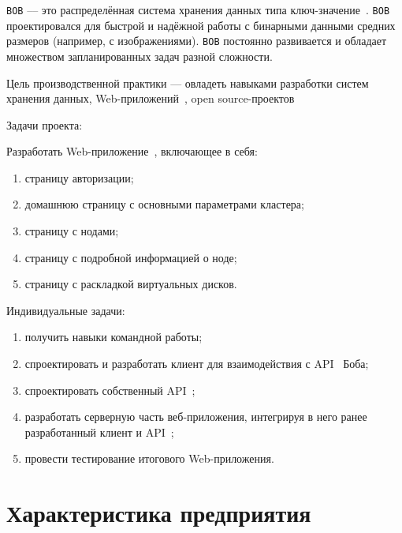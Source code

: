 



	

\normalsize

\setcounter{page}{2}

\tableofcontents
\normalsize

\pagebreak


\texttt{BOB} --– это распределённая система хранения данных типа ключ-значение~\cite{BOB}. \texttt{BOB} проектировался для быстрой и надёжной работы с бинарными данными средних размеров (например, с изображениями). \texttt{BOB} постоянно развивается и обладает множеством запланированных задач разной сложности.

Цель производственной практики --- овладеть навыками разработки систем хранения данных, Web-приложений~\cite{web}, open source-проектов~\cite{oss} 

Задачи проекта:

Разработать Web-приложение~\cite{web}, включающее в себя:
\begin{enumerate}
	\item страницу авторизации;
	\item домашнюю страницу с основными параметрами кластера;
	\item страницу с нодами;
	\item страницу с подробной информацией о ноде;
	\item страницу с раскладкой виртуальных дисков.
\end{enumerate}

Индивидуальные задачи: 

\begin{enumerate}
	\item получить навыки командной работы;
	\item спроектировать и разработать клиент для взаимодействия с API~\cite{api} Боба;
	\item спроектировать собственный API~\cite{api};
	\item разработать серверную часть веб-приложения, интегрируя в него ранее разработанный клиент и API~\cite{api};
	\item провести тестирование итогового Web-приложения.
\end{enumerate}

\clearpage

\section{Характеристика предприятия}

